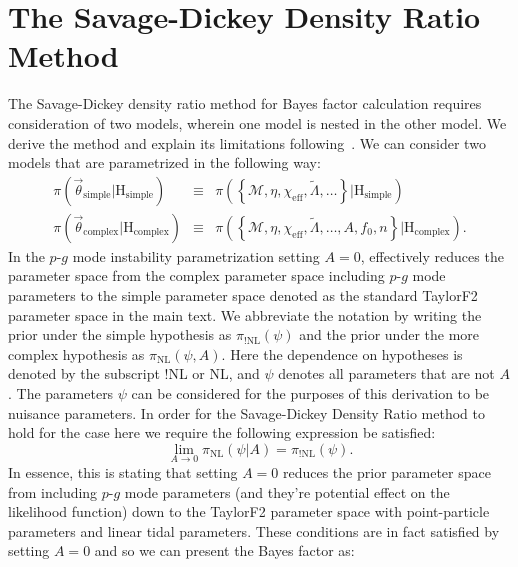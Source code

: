 \section{The Savage-Dickey Density Ratio Method}\label{sec:sddr_derivation}
The Savage-Dickey density ratio method for Bayes factor calculation requires consideration of two models, wherein one model is nested in the other model. We derive the method and explain its limitations following~\cite{wagenmakers2010bayesian}. We can consider two models that are parametrized in the following way:
\begin{eqnarray}
    \pi \left(\vec{\theta}_{\mathrm{simple}}|\mathrm{H}_{\mathrm{simple}}\right)  &\equiv& \pi \left(\left \{\mathcal{M}, \eta, \chi_{\mathrm{eff}}, \tilde{\Lambda}, \ldots  \right \} | \mathrm{H}_{\mathrm{simple}} \right)\\
    \pi \left(\vec{\theta}_{\mathrm{complex}}| \mathrm{H}_{\mathrm{complex}}\right) &\equiv& \pi \left(\left \{\mathcal{M}, \eta, \chi_{\mathrm{eff}}, \tilde{\Lambda}, \ldots , A, f_0, n \right \}| \mathrm{H}_{\mathrm{complex}}\right).
\end{eqnarray}
In the $p$-$g$ mode instability parametrization setting $A = 0$, effectively reduces the parameter space from the complex parameter space including $p$-$g$ mode parameters to the simple parameter space denoted as the standard TaylorF2 parameter space in the main text. We abbreviate the notation by writing the prior under the simple hypothesis  as $\pi_{!\mathrm{NL}} \left(\psi \right)$ and the prior under the more complex hypothesis as $\pi_{\mathrm{NL}} \left(\psi, A\right)$. Here the dependence on hypotheses is denoted by the subscript !NL or NL, and $\psi$ denotes all parameters that are not $A$. The parameters $\psi$ can be considered for the purposes of this derivation to be nuisance parameters. In order for the Savage-Dickey Density Ratio method to hold for the case here we require the following expression be satisfied:
\begin{equation}\label{eqn:sddr_condition}
    \lim_{A \to 0} \pi_{\mathrm{NL}} \left(\psi | A\right) = \pi_{\mathrm{!NL}}\left(\psi\right).
\end{equation}
In essence, this is stating that setting $A = 0$ reduces the prior parameter space from including $p$-$g$ mode parameters (and they're potential effect on the likelihood function) down to the TaylorF2 parameter space with point-particle parameters and linear tidal parameters. These conditions are in fact satisfied by setting $A=0$ and so we can present the Bayes factor as:
